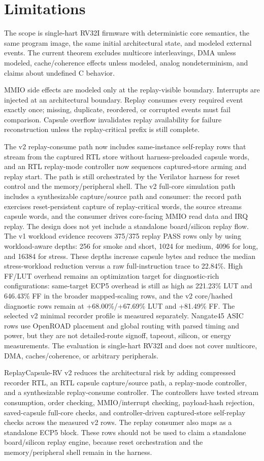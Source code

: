 \section{Limitations}

The scope is single-hart RV32I firmware with deterministic core semantics, the same program image, the same initial architectural state, and modeled external events. The current theorem excludes multicore interleavings, DMA unless modeled, cache/coherence effects unless modeled, analog nondeterminism, and claims about undefined C behavior.

MMIO side effects are modeled only at the replay-visible boundary. Interrupts are injected at an architectural boundary. Replay consumes every required event exactly once; missing, duplicate, reordered, or corrupted events must fail comparison. Capsule overflow invalidates replay availability for failure reconstruction unless the replay-critical prefix is still complete.

The v2 replay-consume path now includes same-instance self-replay rows that stream from the captured RTL store without harness-preloaded capsule words, and an RTL replay-mode controller now sequences captured-store arming and replay start. The path is still orchestrated by the Verilator harness for reset control and the memory/peripheral shell. The v2 full-core simulation path includes a synthesizable capture/source path and consumer: the record path exercises reset-persistent capture of replay-critical words, the source streams capsule words, and the consumer drives core-facing MMIO read data and IRQ replay. The design does not yet include a standalone board/silicon replay flow. The v1 workload evidence recovers 375/375 replay PASS rows only by using workload-aware depths: 256 for smoke and short, 1024 for medium, 4096 for long, and 16384 for stress. These depths increase capsule bytes and reduce the median stress-workload reduction versus a raw full-instruction trace to 22.84\%. High FF/LUT overhead remains an optimization target for diagnostic-rich configurations: same-target ECP5 overhead is still as high as 221.23\% LUT and 646.43\% FF in the broader mapped-scaling rows, and the v2 core/hashed diagnostic rows remain at +68.00\%/+67.69\% LUT and +81.49\% FF. The selected v2 minimal recorder profile is measured separately. Nangate45 ASIC rows use OpenROAD placement and global routing with parsed timing and power, but they are not detailed-route signoff, tapeout, silicon, or energy measurements. The evaluation is single-hart RV32I and does not cover multicore, DMA, caches/coherence, or arbitrary peripherals.

ReplayCapsule-RV v2 reduces the architectural risk by adding compressed recorder RTL, an RTL capsule capture/source path, a replay-mode controller, and a synthesizable replay-consume controller. The controllers have tested stream consumption, order checking, MMIO/interrupt checking, payload-hash rejection, saved-capsule full-core checks, and controller-driven captured-store self-replay checks across the measured v2 rows. The replay consumer also maps as a standalone ECP5 block. These rows should not be used to claim a standalone board/silicon replay engine, because reset orchestration and the memory/peripheral shell remain in the harness.
